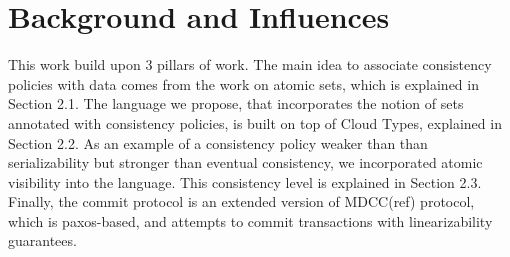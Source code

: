 

\section{Background and Influences}
This work build upon 3 pillars of work. The main idea to associate consistency
policies with data comes from the work on atomic sets, which is explained in
Section 2.1. The language we propose, that incorporates the notion of sets
annotated with consistency policies, is built on top of Cloud Types, explained
in Section 2.2. As an example of a consistency policy weaker than than
serializability but stronger than eventual consistency, we incorporated atomic
visibility into the language. This consistency level is explained in Section
2.3. Finally, the commit protocol is an extended version of MDCC(ref) protocol,
which is paxos-based, and attempts to commit transactions with linearizability
guarantees.

